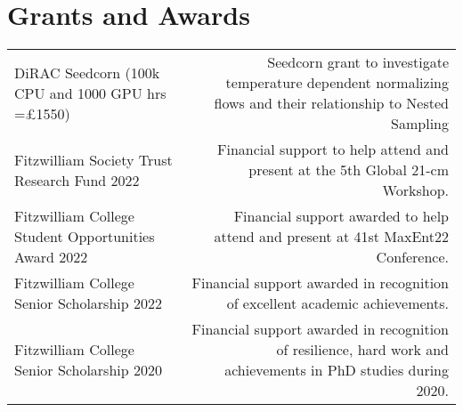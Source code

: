 \documentclass{article}
\begin{document}

\section*{Grants and Awards}

\begin{tabular}{l!{\vrule}r}
    DiRAC Seedcorn (100k CPU and 1000 GPU hrs =£1550) & Seedcorn grant to investigate temperature dependent normalizing flows and their relationship to Nested Sampling \\
    Fitzwilliam Society Trust Research Fund 2022 & Financial support to help attend and present at the 5th Global 21-cm Workshop. \\
	Fitzwilliam College Student Opportunities Award 2022 & Financial support awarded to help attend and present at 41st MaxEnt22 Conference. \\
	Fitzwilliam College Senior Scholarship 2022 & Financial support awarded in recognition of excellent academic achievements. \\
	Fitzwilliam College Senior Scholarship 2020 & Financial support awarded in recognition of resilience, hard work and achievements in PhD studies during 2020.
\end{tabular}
\end{document}
